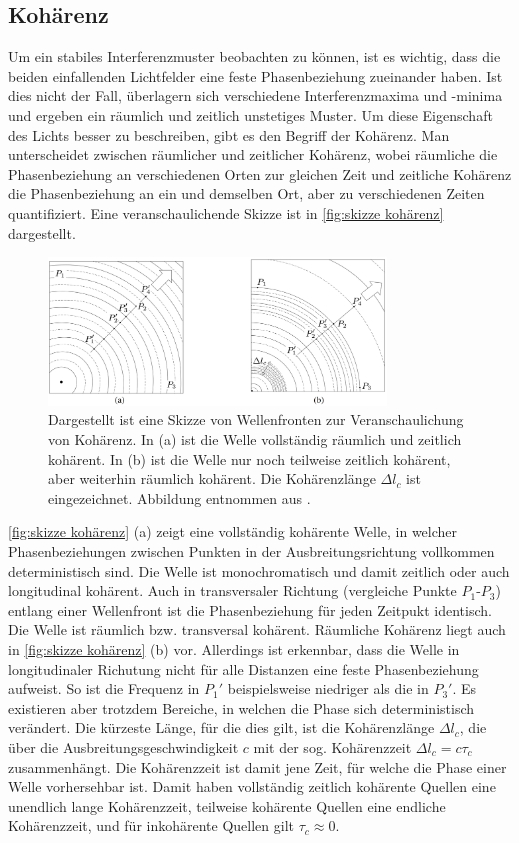 \subsection{Kohärenz}
\label{ssec:Kohärenz}
Um ein stabiles Interferenzmuster beobachten zu können, ist es wichtig, dass die beiden einfallenden Lichtfelder eine feste Phasenbeziehung zueinander haben. 
Ist dies nicht der Fall, überlagern sich verschiedene Interferenzmaxima und -minima und ergeben ein räumlich und zeitlich unstetiges Muster. 
Um diese Eigenschaft des Lichts besser zu beschreiben, gibt es den Begriff der Kohärenz.
Man unterscheidet zwischen räumlicher und zeitlicher Kohärenz, wobei räumliche die Phasenbeziehung an verschiedenen Orten zur gleichen Zeit und zeitliche Kohärenz die Phasenbeziehung an ein und demselben Ort, aber zu verschiedenen Zeiten quantifiziert. \cite[Kap. 9.2]{hechtOptik2018}
Eine veranschaulichende Skizze ist in \autoref{fig:skizze kohärenz} dargestellt.
\begin{figure}[h]
    \centering
    \includegraphics[width=0.8\textwidth]{images/Theorie/Hecht_9.6.png}
    \caption{Dargestellt ist eine Skizze von Wellenfronten zur Veranschaulichung von Kohärenz. In (a) ist die Welle vollständig räumlich und zeitlich kohärent. In (b) ist die Welle nur noch teilweise zeitlich kohärent, aber weiterhin räumlich kohärent. Die Kohärenzlänge $\Delta l_c$ ist eingezeichnet. Abbildung entnommen aus \cite{hechtOptik2018}.}
    \label{fig:skizze kohärenz}
\end{figure}
\autoref{fig:skizze kohärenz} (a) zeigt eine vollständig kohärente Welle, in welcher Phasenbeziehungen zwischen Punkten in der Ausbreitungsrichtung vollkommen deterministisch sind. 
Die Welle ist monochromatisch und damit zeitlich oder auch longitudinal kohärent. 
Auch in transversaler Richtung (vergleiche Punkte $P_1$-$P_3$) entlang einer Wellenfront ist die Phasenbeziehung für jeden Zeitpukt identisch. 
Die Welle ist räumlich bzw. transversal kohärent. 
Räumliche Kohärenz liegt auch in \autoref{fig:skizze kohärenz} (b) vor. 
Allerdings ist erkennbar, dass die Welle in longitudinaler Richutung nicht für alle Distanzen eine feste Phasenbeziehung aufweist. 
So ist die Frequenz in $P_1'$ beispielsweise niedriger als die in $P_3'$. 
Es existieren aber trotzdem Bereiche, in welchen die Phase sich deterministisch verändert. 
Die kürzeste Länge, für die dies gilt, ist die Kohärenzlänge $\Delta l_c$, die über die Ausbreitungsgeschwindigkeit $c$ mit der sog. Kohärenzzeit $\Delta l_c = c\tau_c$ zusammenhängt. 
Die Kohärenzzeit ist damit jene Zeit, für welche die Phase einer Welle vorhersehbar ist. 
Damit haben vollständig zeitlich kohärente Quellen eine unendlich lange Kohärenzzeit, teilweise kohärente Quellen eine endliche Kohärenzzeit, und für inkohärente Quellen gilt $\tau_c\approx 0$. 

